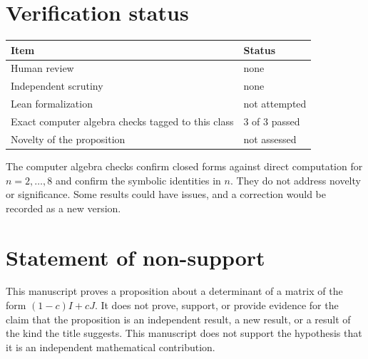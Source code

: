 \documentclass[11pt]{article}
\begin{document}
\section{Verification status}
\begin{center}
\small
\begin{tabular}{ll}
\toprule
Item & Status \\
\midrule
Human review & none \\
Independent scrutiny & none \\
Lean formalization & not attempted \\
Exact computer algebra checks tagged to this class & 3 of 3 passed \\
Novelty of the proposition & not assessed \\
\bottomrule
\end{tabular}
\end{center}
The computer algebra checks confirm closed forms against direct computation for $n=2,\dots,8$ and confirm the symbolic identities in $n$. They do not address novelty or significance. Some results could have issues, and a correction would be recorded as a new version.

\section{Statement of non-support}
This manuscript proves a proposition about a determinant of a matrix of the form $(1-c)I+cJ$. It does not prove, support, or provide evidence for the claim that the proposition is an independent result, a new result, or a result of the kind the title suggests. This manuscript does not support the hypothesis that it is an independent mathematical contribution.


\end{document}
